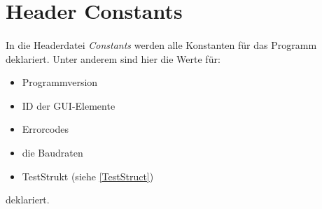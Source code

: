 \section{Header Constants}
\paragraph{}
In die Headerdatei \textit{Constants} werden alle Konstanten für das Programm deklariert. Unter anderem sind hier die Werte für:

\begin{itemize}
\item Programmversion
\item ID der GUI-Elemente
\item Errorcodes
\item die Baudraten
\item TestStrukt (siehe \ref{TestStruct})
\end{itemize}

deklariert.